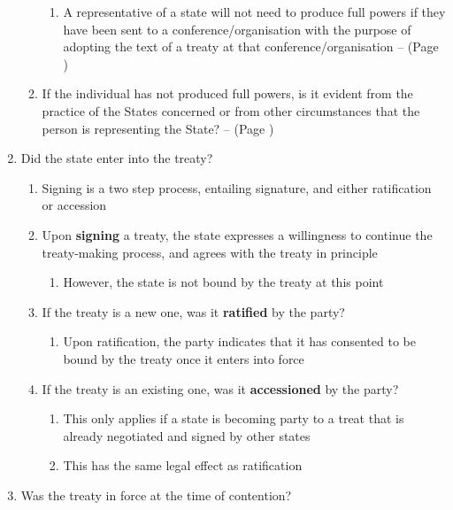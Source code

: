 \begin{enumerate}
\begin{enumerate}
\begin{enumerate}
            \item A representative of a state will not need to produce full powers if they have been sent to a conference/organisation with the purpose of adopting the text of a treaty at that conference/organisation --  (Page \pageref{VCLT Art 2})
        \end{enumerate}
        \item If the individual has not produced full powers, is it evident from the practice of the States concerned or from other circumstances that the person is representing the State? --  (Page \pageref{VCLT Art 2})
    \end{enumerate}
    \item Did the state enter into the treaty?
    \begin{enumerate}
        \item Signing is a two step process, entailing signature, and either ratification or accession
        \item Upon \textbf{signing} a treaty, the state expresses a willingness to continue the treaty-making process, and agrees with the treaty in principle
        \begin{enumerate}
            \item However, the state is not bound by the treaty at this point
        \end{enumerate}
        \item If the treaty is a new one, was it \textbf{ratified} by the party?
        \begin{enumerate}
            \item Upon ratification, the party indicates that it has consented to be bound by the treaty once it enters into force
        \end{enumerate}
        \item If the treaty is an existing one, was it \textbf{accessioned} by the party?
        \begin{enumerate}
            \item This only applies if a state is becoming party to a treat that is already negotiated and signed by other states
            \item This has the same legal effect as ratification
        \end{enumerate}
    \end{enumerate}
    \item Was the treaty in force at the time of contention?

\end{enumerate}
